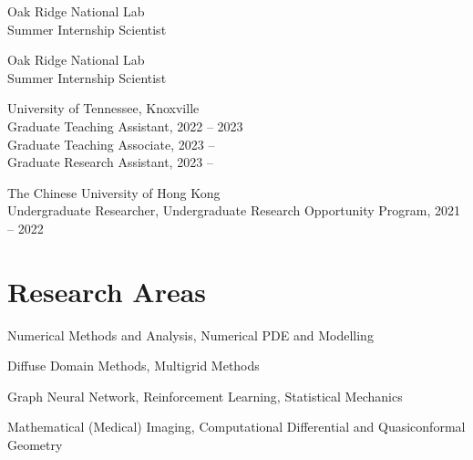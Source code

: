 \documentclass[11pt,letterpaper]{report}
\newcommand{\listitemspace}{0.5em}
\renewenvironment{itemize}
{\begin{list}{}{\setlength{\leftmargin}{0em}
                \setlength{\parskip}{0em}
                \setlength{\itemsep}{\listitemspace}
                \setlength{\parsep}{\listitemspace}}}
{\end{list}}
\begin{document}
    \begin{tablist}

    \item[2025]   \tab{}Oak Ridge National Lab \\
                              Summer Internship Scientist\\

    \item[2024]   \tab{}Oak Ridge National Lab \\
                              Summer Internship Scientist\\

        \item[2022--]   \tab{}University of Tennessee, Knoxville \\
                              Graduate Teaching Assistant, 2022 -- 2023\\
                              Graduate Teaching Associate, 2023 -- \\
                              Graduate Research Assistant, 2023 --\\

        \item[2021--2022]   \tab{}The Chinese University of Hong Kong \\
                              Undergraduate Researcher, Undergraduate Research Opportunity Program, 2021 -- 2022  \\

    \end{tablist}



    \section*{Research Areas}

    \begin{itemize}

        \item Numerical Methods and Analysis, Numerical PDE and Modelling
        \item Diffuse Domain Methods, Multigrid Methods
        \item Graph Neural Network, Reinforcement Learning, Statistical Mechanics
        \item Mathematical (Medical) Imaging, Computational Differential and Quasiconformal Geometry


    \end{itemize}
\end{document}
